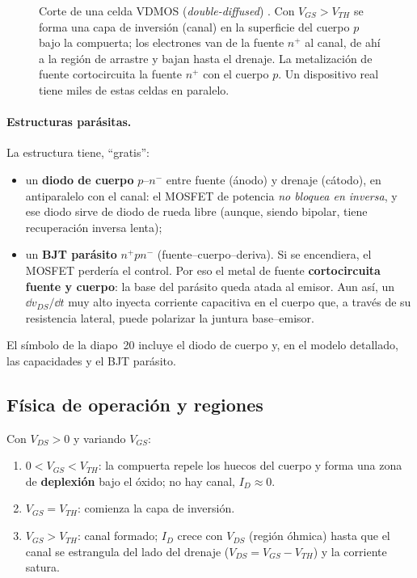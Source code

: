 \begin{figure}[H]
\caption{Corte de una celda VDMOS (\emph{double-diffused}) . Con $V_{GS}>V_{TH}$ se forma
una capa de inversión (canal) en la superficie del cuerpo $p$ bajo la compuerta; los electrones van
de la fuente $n^+$ al canal, de ahí a la región de arrastre y bajan hasta el drenaje. La metalización
de fuente cortocircuita la fuente $n^+$ con el cuerpo $p$. Un dispositivo real tiene miles de estas
celdas en paralelo.}
\label{fig:vdmos}
\end{figure}

\paragraph{Estructuras parásitas.} La estructura tiene, ``gratis'':
\begin{itemize}
  \item un \textbf{diodo de cuerpo} $p$--$n^-$ entre fuente (ánodo) y drenaje (cátodo), en antiparalelo
  con el canal: el MOSFET de potencia \emph{no bloquea en inversa}, y ese diodo sirve de diodo de
  rueda libre (aunque, siendo bipolar, tiene recuperación inversa lenta);
  \item un \textbf{BJT parásito} $n^+pn^-$ (fuente--cuerpo--deriva). Si se encendiera, el MOSFET
  perdería el control. Por eso el metal de fuente \textbf{cortocircuita fuente y cuerpo}: la base del
  parásito queda atada al emisor. Aun así, un $\dd v_{DS}/\dd t$ muy alto inyecta corriente capacitiva
  en el cuerpo que, a través de su resistencia lateral, puede polarizar la juntura base--emisor.
\end{itemize}
El símbolo de la diapo~20 incluye el diodo de cuerpo y, en el modelo detallado, las capacidades y el
BJT parásito.

\subsection{Física de operación y regiones}

 Con $V_{DS}>0$ y variando $V_{GS}$:
\begin{enumerate}
  \item $0<V_{GS}<V_{TH}$: la compuerta repele los huecos del cuerpo y forma una zona de
  \textbf{deplexión} bajo el óxido; no hay canal, $I_D\approx0$.
  \item $V_{GS}=V_{TH}$: comienza la capa de inversión.
  \item $V_{GS}>V_{TH}$: canal formado; $I_D$ crece con $V_{DS}$ (región óhmica) hasta que el canal se
  estrangula del lado del drenaje ($V_{DS}=V_{GS}-V_{TH}$) y la corriente satura.
\end{enumerate}

